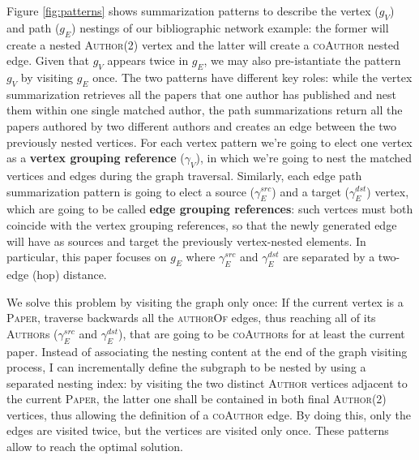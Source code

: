 \begin{ex}[label=ex2,continues=ex1]
	Figure \ref{fig:patterns} shows summarization patterns to describe the vertex ($g_V$) and path ($g_E$) nestings of our bibliographic network example: the former will create a nested \textsc{Author}(2) vertex and the latter will create a \textsc{coAuthor} nested edge. Given that $g_V$ appears twice in $g_E$, we may also pre-istantiate the pattern $g_V$ by visiting $g_E$ once. The two patterns have different key roles: while the vertex summarization retrieves all the papers that one author has published and nest them within one single matched author, the path summarizations return all the papers authored by two different authors and creates an edge between the two previously nested vertices. %
	For each vertex pattern we're going to elect one vertex as a \textbf{vertex grouping reference} ($\gamma_V$), in which we're going to nest the matched vertices and edges  during the graph traversal. Similarly, each edge path summarization pattern is going to elect a source ($\gamma_E^{src}$) and a target ($\gamma_E^{dst}$) vertex, which are going to be called \textbf{edge grouping references}: such vertces must both coincide with the vertex grouping references, so that the newly generated edge will have as sources and target the previously vertex-nested elements. In particular, this paper focuses on $g_E$ where $\gamma_E^{src}$  and $\gamma_E^{dst}$ are separated by a two-edge (hop) distance.
	
	
	We solve this problem by visiting the graph only once: %
	If the current vertex is a \textsc{Paper}, traverse backwards all the \textsc{authorOf} edges, thus reaching all of its \textsc{Author}s ($\gamma_E^{src}$ and $\gamma_E^{dst}$), that are going to be \textsc{coAuthor}s for at least the current paper. Instead of associating the nesting content at the end of the graph visiting process, I can incrementally define the subgraph to be nested by using a separated nesting index: by visiting the two distinct \textsc{Author} vertices adjacent to the current \textsc{Paper}, the latter one shall be contained in both final \textsc{Author}(2) vertices, thus allowing the definition of a  \textsc{coAuthor} edge. %
	By doing this, only the edges are visited twice, but the vertices are visited only once. These patterns allow to reach the optimal solution.
	
\end{ex}

